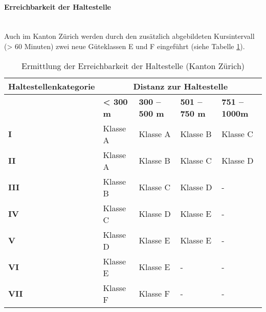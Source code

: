 \paragraph{Erreichbarkeit der Haltestelle}~\\
\label{Berechnungsmethodik Kanton Zürich:Erreichbarkeit der Haltestelle}
Auch im Kanton Zürich werden durch den zusätzlich abgebildeten Kursintervall (> 60 Minuten) zwei neue Güteklassen E und F eingeführt (siehe Tabelle \ref{table:Ermittlung Erreichbarkeit der Haltestelle (Kanton Zürich)}).

\begin{table}[ht]
    \begin{tabular}[c]{l p{2.5cm} p{2.5cm} p{2.5cm} p{2.5cm}}
        \toprule
        \textbf{Haltestellenkategorie}
                                & \multicolumn{4}{c}{\textbf{Distanz zur \gls{Haltestelle}}}\\
        \midrule
        \textbf{}
                                & \textbf{< 300 m}
                                & \textbf{300 -- 500 m}
                                & \textbf{501 -- 750 m}
                                & \textbf{751 -- 1000m}\\
        \textbf{I}
                                & Klasse A
                                & Klasse A
                                & Klasse B
                                & Klasse C\\
        \textbf{II}
                                & Klasse A
                                & Klasse B
                                & Klasse C
                                & Klasse D\\
        \textbf{III}
                                & Klasse B
                                & Klasse C
                                & Klasse D
                                & -\\
        \textbf{IV}
                                & Klasse C
                                & Klasse D
                                & \cellcolor{red!25}Klasse E
                                & -\\
        \textbf{V}
                                & Klasse D
                                & \cellcolor{red!25}Klasse E
                                & \cellcolor{red!25}Klasse E
                                & -\\
        \cellcolor{red!25}\textbf{VI}
                                & \cellcolor{red!25}Klasse E
                                & \cellcolor{red!25}Klasse E
                                & -
                                & -\\
        \cellcolor{red!25}\textbf{VII}
                                & \cellcolor{red!25}Klasse F
                                & \cellcolor{red!25}Klasse F
                                & -
                                & -\\                                
        \bottomrule
    \end{tabular}
    \caption{Ermittlung der Erreichbarkeit der \gls{Haltestelle} (Kanton Zürich)}
    \label{table:Ermittlung Erreichbarkeit der Haltestelle (Kanton Zürich)}
\end{table}

